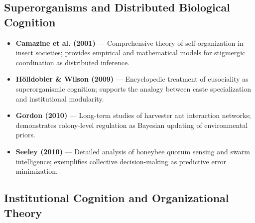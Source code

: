 \documentclass[11pt,a4paper]{article}
\begin{document}
\subsection*{Superorganisms and Distributed Biological Cognition}

\begin{itemize}
    \item \textbf{Camazine et al. (2001)} — Comprehensive theory of self-organization in insect societies; provides empirical and mathematical models for stigmergic coordination as distributed inference.
    \item \textbf{Hölldobler \& Wilson (2009)} — Encyclopedic treatment of eusociality as superorganismic cognition; supports the analogy between caste specialization and institutional modularity.
    \item \textbf{Gordon (2010)} — Long-term studies of harvester ant interaction networks; demonstrates colony-level regulation as Bayesian updating of environmental priors.
    \item \textbf{Seeley (2010)} — Detailed analysis of honeybee quorum sensing and swarm intelligence; exemplifies collective decision-making as predictive error minimization.
\end{itemize}

\subsection*{Institutional Cognition and Organizational Theory}
\end{document}
